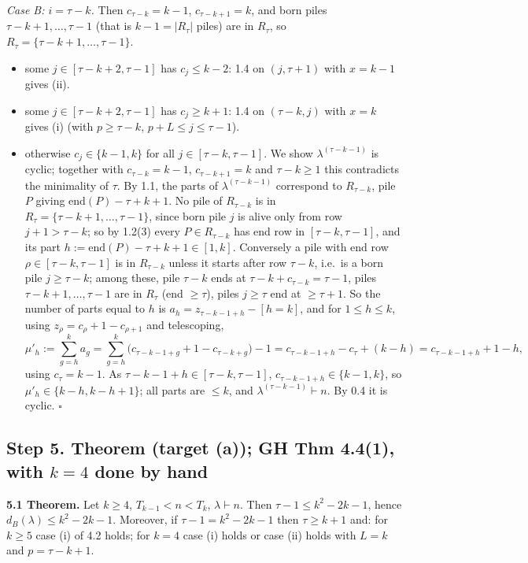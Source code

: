 \documentclass[11pt]{article}
\begin{document}
\emph{Case B: $i=\tau-k$.} Then $c_{\tau-k}=k-1$, $c_{\tau-k+1}=k$, and born piles $\tau-k+1,\dots,\tau-1$ (that is $k-1=|R_\tau|$ piles) are in $R_\tau$, so $R_\tau=\{\tau-k+1,\dots,\tau-1\}$.
\begin{itemize}
\item[B1:] some $j\in[\tau-k+2,\tau-1]$ has $c_j\le k-2$: 1.4 on $(j,\tau+1)$ with $x=k-1$ gives (ii).
\item[B2:] some $j\in[\tau-k+2,\tau-1]$ has $c_j\ge k+1$: 1.4 on $(\tau-k,j)$ with $x=k$ gives (i) (with $p\ge\tau-k$, $p+L\le j\le\tau-1$).
\item[B3:] otherwise $c_j\in\{k-1,k\}$ for all $j\in[\tau-k,\tau-1]$. We show $\lambda^{(\tau-k-1)}$ is cyclic; together with $c_{\tau-k}=k-1$, $c_{\tau-k+1}=k$ and $\tau-k\ge1$ this contradicts the minimality of $\tau$. By 1.1, the parts of $\lambda^{(\tau-k-1)}$ correspond to $R_{\tau-k}$, pile $P$ giving $\mathrm{end}(P)-\tau+k+1$. No pile of $R_{\tau-k}$ is in $R_\tau=\{\tau-k+1,\dots,\tau-1\}$, since born pile $j$ is alive only from row $j+1>\tau-k$; so by 1.2(3) every $P\in R_{\tau-k}$ has end row in $[\tau-k,\tau-1]$, and its part $h:=\mathrm{end}(P)-\tau+k+1\in[1,k]$. Conversely a pile with end row $\rho\in[\tau-k,\tau-1]$ is in $R_{\tau-k}$ unless it starts after row $\tau-k$, i.e.\ is a born pile $j\ge\tau-k$; among these, pile $\tau-k$ ends at $\tau-k+c_{\tau-k}=\tau-1$, piles $\tau-k+1,\dots,\tau-1$ are in $R_\tau$ (end $\ge\tau$), piles $j\ge\tau$ end at $\ge\tau+1$. So the number of parts equal to $h$ is $a_h=z_{\tau-k-1+h}-[h=k]$, and for $1\le h\le k$, using $z_\rho=c_\rho+1-c_{\rho+1}$ and telescoping,
\[
\mu'_h:=\sum_{g=h}^{k}a_g=\sum_{g=h}^{k}\bigl(c_{\tau-k-1+g}+1-c_{\tau-k+g}\bigr)-1=c_{\tau-k-1+h}-c_\tau+(k-h)=c_{\tau-k-1+h}+1-h,
\]
using $c_\tau=k-1$. As $\tau-k-1+h\in[\tau-k,\tau-1]$, $c_{\tau-k-1+h}\in\{k-1,k\}$, so $\mu'_h\in\{k-h,k-h+1\}$; all parts are $\le k$, and $\lambda^{(\tau-k-1)}\vdash n$. By 0.4 it is cyclic. $\square$
\end{itemize}

\subsection*{Step 5. Theorem (target (a)); GH Thm 4.4(1), with $k=4$ done by hand}

\textbf{5.1 Theorem.} Let $k\ge4$, $T_{k-1}<n<T_k$, $\lambda\vdash n$. Then $\tau-1\le k^2-2k-1$, hence $d_B(\lambda)\le k^2-2k-1$. Moreover, if $\tau-1=k^2-2k-1$ then $\tau\ge k+1$ and: for $k\ge5$ case (i) of 4.2 holds; for $k=4$ case (i) holds or case (ii) holds with $L=k$ and $p=\tau-k+1$.
\end{document}
